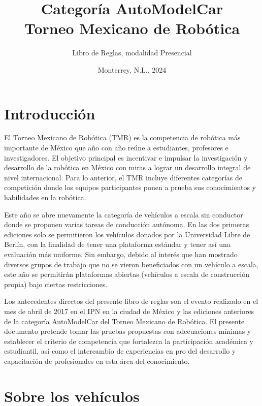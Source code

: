\documentclass[letterpaper,12pt]{article}
\title{Categoría AutoModelCar\\Torneo Mexicano de Robótica}
\author{Libro de Reglas, modalidad Presencial}
\date{Monterrey, N.L., 2024}
\begin{document}
\renewcommand{\tablename}{Tabla}
\maketitle

\section{Introducción}
El Torneo Mexicano de Robótica (TMR) es la competencia de robótica más importante de México que año con año reúne a estudiantes, profesores e investigadores. El objetivo principal es incentivar e impulsar la investigación y desarrollo de la robótica en México con miras a lograr un desarrollo integral de nivel internacional. Para lo anterior, el TMR incluye diferentes categorías de competición donde los equipos participantes ponen a prueba sus conocimientos y habilidades en la robótica.

Este año se abre nuevamente la categoría de vehículos a escala sin conductor donde se proponen varias tareas de conducción autónoma. En las dos primeras ediciones solo se permitieron los vehículos donados por la Universidad Libre de Berlín, con la finalidad de tener una plataforma estándar y tener así una evaluación más uniforme. Sin embargo, debido al interés que han mostrado diversos grupos de trabajo que no se vieron beneficiados con un vehículo a escala, este año se permitirán plataformas abiertas (vehículos a escala de construcción propia) bajo ciertas restricciones.

Los antecedentes directos del presente libro de reglas son el evento realizado en el mes de abril de 2017 en el IPN en la ciudad de México y las ediciones anteriores de la categoría AutoModelCar del Torneo Mexicano de Robótica. El presente documento pretende tomar las pruebas propuestas con adecuaciones mínimas y establecer el criterio de competencia que fortalezca la participación académica y estudiantil, así como el intercambio de experiencias en pro del desarrollo y capacitación de profesionales en esta área del conocimiento.
\[\]
\section{Sobre los vehículos}
\end{document}
